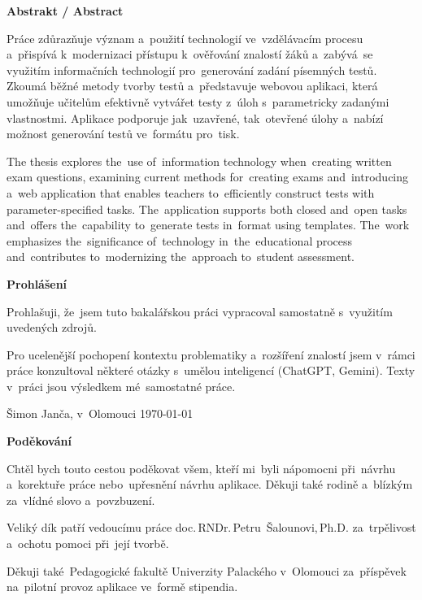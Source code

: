 \documentclass[11pt,a4paper]{report}
\newenvironment{singletonpage}[1]{
    \thispagestyle{empty} %
    \setlength{\parskip}{10pt} %
    \setlength{\parindent}{0pt}
    \vspace*{\stretch{1}} %
    \begin{center}      %
        \textbf{\Huge #1}\\[.4cm]
    \end{center}
}{
    \vspace*{\stretch{3}} %
    \clearpage          %
}
\begin{document}
    \begin{singletonpage}{Abstrakt / Abstract}
    
        Práce zdůrazňuje význam a~použití technologií ve~vzdělávacím procesu a~přispívá k~modernizaci přístupu k~ověřování znalostí žáků a~zabývá~se využitím informačních technologií pro~generování zadání písemných testů. Zkoumá běžné metody tvorby testů a~představuje webovou aplikaci, která umožňuje učitelům efektivně vytvářet testy z~úloh s~parametricky zadanými vlastnostmi. Aplikace podporuje jak~uzavřené, tak~otevřené úlohy a~nabízí možnost generování testů ve~formátu pro~tisk.

        The thesis explores the~use of~information technology when~creating written exam questions, examining current methods for~creating exams and~introducing a~web application that enables teachers to~efficiently construct tests with parameter-specified tasks. The~application supports both closed and~open tasks and~offers the~capability to~generate tests in~format using templates. The~work emphasizes the~significance of~technology in~the~educational process and~contributes to~modernizing the~approach to~student assessment.
    \end{singletonpage}
    
    \begin{singletonpage}{Prohlášení}
    
        Prohlašuji, že~jsem tuto bakalářskou práci vypracoval samostatně s~využitím uvedených zdrojů.

        Pro ucelenější pochopení kontextu problematiky a~rozšíření znalostí jsem v~rámci práce konzultoval některé otázky s~umělou inteligencí (ChatGPT, Gemini). Texty v~práci jsou výsledkem mé~samostatné práce.

        Šimon Janča, v~Olomouci \today
    \end{singletonpage}

    \begin{singletonpage}{Poděkování}
    
        Chtěl bych touto cestou poděkovat všem, kteří mi~byli nápomocni při~návrhu a~korektuře práce nebo~upřesnění návrhu aplikace. Děkuji také rodině a~blízkým za~vlídné slovo a~povzbuzení.
        
        Veliký dík patří vedoucímu práce doc.\,RNDr.\,Petru~Šalounovi,\,Ph.D. za~trpělivost a~ochotu pomoci při~její tvorbě.
        
        Děkuji také~Pedagogické fakultě Univerzity Palackého v~Olomouci za~příspěvek na~pilotní provoz aplikace ve~formě stipendia.
    \end{singletonpage}
    
\end{document}
